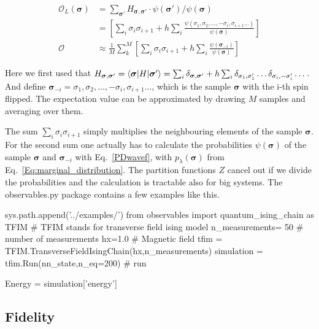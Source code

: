 \documentclass[submission, Phys]{SciPost}
\begin{document}
\begin{align}
\mathcal{O}_L({\bm{\sigma}}) &= \sum_{ \bm{\sigma'}} H_{\bm{\sigma}, \bm{\sigma}'} \cdot \psi(\bm{\sigma}') / \psi(\bm{\sigma}) \\
&=   \left[ \sum_i \sigma_i \sigma_{i+1} + h \sum_i \frac{\psi(\sigma_1, \sigma_2, \dots , -\sigma_i, \sigma_{i+1} \dots)}{\psi (\bm{\sigma})} \right]\\
\mathcal{O} &\approx \frac{1}{M} \sum_k^M \left[ \sum_i \sigma_i \sigma_{i+1} + h \sum_i \frac{\psi (\bm{\sigma}_{-i})}{\psi (\bm{\sigma})} \right]
\end{align}

Here we first used that $H_{\bm{\sigma}, \bm{\sigma}'}  = \braket{\bm{\sigma} | H | \bm{\sigma}'} = \sum_i \delta_{\bm{\sigma}, \bm{\sigma}'} + h \sum_i \delta_{\sigma_1, \sigma_1'} \dots \delta_{\sigma_i, -\sigma_i'} \dots$. And define $\bm{\sigma}_{-i} = \sigma_1, \sigma_2, \dots , -\sigma_i, \sigma_{i+1} \dots$, which is the sample $\bm{\sigma}$ with the i-th spin flipped.
The expectation value can be approximated by drawing $M$ samples and averaging over them.

The sum $\sum_i \sigma_i \sigma_{i+1}$ simply multiplies the neighbouring elements of the sample $\bm{\sigma}$. For the second sum one actually has to calculate the probabilities $\psi (\bm{\sigma})$ of the sample $\bm{\sigma}$ and $\bm{\sigma}_{-i} $ with
Eq.~\ref{PDwavef},
with $p_{\lambda}(\bm{\sigma})$ from Eq.~\ref{Eq:marginal_distribution}. The partition functions $Z$ cancel out if we divide the probabilities and the calculation is tractable also for big systems.
The observables.py package contains a few examples like this.

\begin{python}
sys.path.append('../examples/')
from observables import quantum_ising_chain as TFIM
# TFIM stands for transverse field ising model
n_measurements= 50 # number of measurements
hx=1.0             # Magnetic field
tfim = TFIM.TransverseFieldIsingChain(hx,n_measurements)
simulation = tfim.Run(nn_state,n_eq=200) # run 

Energy = simulation['energy']
\end{python}

\subsection{Fidelity}
\end{document}
